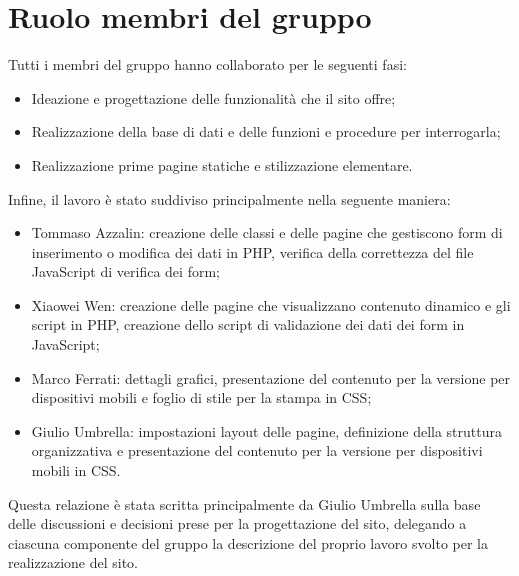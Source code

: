 \documentclass[1_relazione.tex]{subfiles}
\begin{document}
\section{Ruolo membri del gruppo}
Tutti i membri del gruppo hanno collaborato per le seguenti fasi:
\begin{itemize}
\item Ideazione e progettazione delle funzionalità che il sito offre;
\item Realizzazione della base di dati e delle funzioni e procedure per interrogarla;
\item Realizzazione prime pagine statiche e stilizzazione elementare.
\end{itemize}

Infine, il lavoro è stato suddiviso principalmente nella seguente maniera:
\begin{itemize}
    \item Tommaso Azzalin: creazione delle classi e delle pagine che gestiscono form di inserimento o modifica dei dati in PHP, verifica della correttezza del file JavaScript di verifica dei form;
    \item Xiaowei Wen: creazione delle pagine che visualizzano contenuto dinamico e gli script in PHP, creazione dello script di validazione dei dati dei form in JavaScript;
    \item Marco Ferrati: dettagli grafici, presentazione del contenuto per la versione per dispositivi mobili e foglio di stile per la stampa in CSS;
    \item Giulio Umbrella: impostazioni layout delle pagine, definizione della struttura organizzativa e presentazione del contenuto per la versione per dispositivi mobili in CSS.
\end{itemize}
Questa relazione è stata scritta principalmente da Giulio Umbrella sulla base delle discussioni e decisioni prese per la progettazione del sito, delegando a ciascuna componente del gruppo la descrizione del proprio lavoro svolto per la realizzazione del sito.
\end{document}
